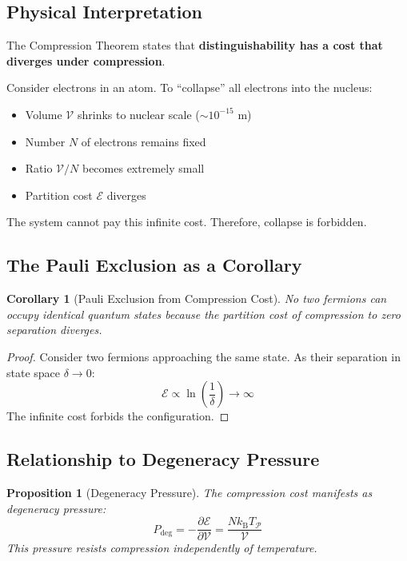 \documentclass[twocolumn,10pt,a4paper]{article}
\newtheorem{proposition}[theorem]{Proposition}
\newtheorem{corollary}[theorem]{Corollary}
\theoremstyle{definition}
\theoremstyle{remark}
\newcommand{\kB}{k_{\mathrm{B}}}
\newcommand{\Partition}{\mathcal{P}}
\newcommand{\Cost}{\mathcal{E}}
\begin{document}
\subsection{Physical Interpretation}

The Compression Theorem states that \textbf{distinguishability has a cost that diverges under compression}.

Consider electrons in an atom. To ``collapse'' all electrons into the nucleus:
\begin{itemize}
    \item Volume $\mathcal{V}$ shrinks to nuclear scale ($\sim 10^{-15}$ m)
    \item Number $N$ of electrons remains fixed
    \item Ratio $\mathcal{V}/N$ becomes extremely small
    \item Partition cost $\Cost$ diverges
\end{itemize}

The system cannot pay this infinite cost. Therefore, collapse is forbidden.

\subsection{The Pauli Exclusion as a Corollary}

\begin{corollary}[Pauli Exclusion from Compression Cost]
\label{cor:pauli_compression}
No two fermions can occupy identical quantum states \cite{pauli1925} because the partition cost of compression to zero separation diverges.
\end{corollary}

\begin{proof}
Consider two fermions approaching the same state. As their separation in state space $\delta \to 0$:
\begin{equation}
    \Cost \propto \ln\left(\frac{1}{\delta}\right) \to \infty
\end{equation}
The infinite cost forbids the configuration.
\end{proof}

\subsection{Relationship to Degeneracy Pressure}

\begin{proposition}[Degeneracy Pressure]
\label{prop:degeneracy}
The compression cost manifests as degeneracy pressure:
\begin{equation}
    P_{\text{deg}} = -\frac{\partial \Cost}{\partial \mathcal{V}} = \frac{N\kB T_{\Partition}}{\mathcal{V}}
\end{equation}
This pressure resists compression independently of temperature.
\end{proposition}
\end{document}
